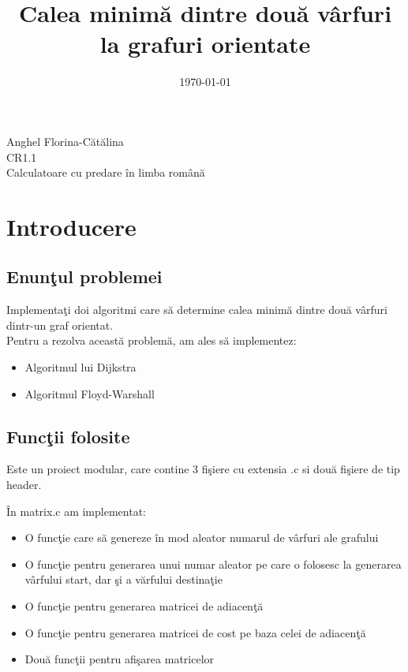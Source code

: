 \documentclass{article}
\begin{document}
\title{\huge{Calea minim\u{a} dintre dou\u{a} v\^{a}rfuri la grafuri orientate}}
\date{\today}
\maketitle


\begin{tabbing}
 {\Large{Anghel Florina-C\u{a}t\u{a}lina} }\\

 {\Large{CR1.1} }\\

 {\Large{Calculatoare cu predare \^{i}n limba rom\^{a}n\u{a}}}
\end{tabbing}

\clearpage


\section{Introducere}
\subsection{Enun\c{t}ul problemei}
Implementa\c{t}i doi algoritmi care s\u{a} determine calea minim\u{a} dintre dou\u{a} v\^{a}rfuri dintr-un graf orientat. 
\\Pentru a rezolva aceast\u{a} problem\u{a}, am ales s\u{a} implementez:
\begin{itemize}
    \item Algoritmul lui Dijkstra
    \item Algoritmul Floyd-Warshall
\end{itemize}

\subsection{Func\c{t}ii folosite}
Este un proiect modular, care contine 3 fi\c{s}iere cu extensia .c si dou\u{a} fi\c{s}iere de tip header. 

\^{I}n matrix.c am implementat:
\begin{itemize}
    \item O func\c{t}ie care s\u{a} genereze \^{i}n mod aleator numarul de v\^{a}rfuri ale grafului
    \item O func\c{t}ie pentru generarea unui numar aleator pe care o folosesc la generarea v\^{a}rfului start, dar \c{s}i a v\u{a}rfului destina\c{t}ie
    \item O func\c{t}ie pentru generarea matricei de adiacen\c{t}\u{a}
    \item O func\c{t}ie pentru generarea matricei de cost pe baza celei de adiacen\c{t}\u{a}
    \item Dou\u{a} func\c{t}ii pentru afi\c{s}area matricelor
\end{itemize}
\end{document}

